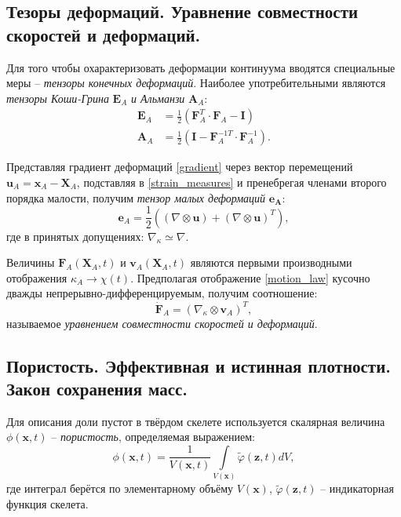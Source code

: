 \subsection{Тезоры деформаций. Уравнение совместности скоростей и деформаций.}
	Для того чтобы охарактеризовать деформации континуума вводятся специальные меры -- \textit{тензоры конечных деформаций}. Наиболее употребительными являются \textit{тензоры Коши-Грина} $\mathbf{E}_A$ \textit{и Альманзи} $\mathbf{A}_A$:
\begin{align}
	\label{strain_measures}
	\mathbf{E}_A &= \frac{1}{2}\left(\mathbf{F}_A^T \cdot \mathbf{F}_A - \mathbf{I}\right)\\
	\mathbf{A}_A &= \frac{1}{2}\left(\mathbf{I} - \mathbf{F}_A^{-1T} \cdot \mathbf{F}_A^{-1}\right).
\end{align}

	Представляя градиент деформаций \eqref{gradient} через вектор перемещений $\mathbf{u}_A = \mathbf{x}_A - \mathbf{X}_A$, подставляя в \eqref{strain_measures} и пренебрегая членами второго порядка малости, получим \textit{тензор малых деформаций} $\mathbf{e_A}$:
\begin{equation}
	\label{small_strains}
	\mathbf{e}_A = \frac{1}{2}\left(\left(\nabla \otimes \mathbf{u}\right) + \left(\nabla\otimes \mathbf{u}\right)^T\right),
\end{equation}
	где в принятых допущениях: $\nabla_{\kappa} \simeq \nabla$.

	Величины $\mathbf{F}_A(\mathbf{X}_A, t)$ и $\mathbf{v}_A(\mathbf{X}_A, t)$ являются первыми производными отображения $\kappa_A \to \chi(t)$. Предполагая отображение \eqref{motion_law} кусочно дважды непрерывно-дифференцируемым, получим соотношение:
\begin{equation}
	\label{velocities_strains}
	\dot{\mathbf{F}}_A = \left(\nabla_{\kappa} \otimes \mathbf{v}_A \right)^T,
\end{equation}
	называемое \textit{уравнением совместности скоростей и деформаций}.

\subsection{Пористость. Эффективная и истинная плотности. Закон сохранения масс.}

	Для описания доли пустот в твёрдом скелете используется скалярная величина $\phi(\mathbf{x}, t)$ -- \textit{пористость}, определяемая выражением:
\begin{equation}
	\label{porosity}
	\phi(\mathbf{x}, t) = \frac{1}{V(\mathbf{x}, t)}\int\limits_{V(\mathbf{x})}\tilde{\varphi}(\mathbf{z}, t) dV,
\end{equation}
	где интеграл берётся по элементарному объёму $V(\mathbf{x})$, $\tilde{\varphi}(\mathbf{z}, t)$ -- индикаторная функция скелета.

